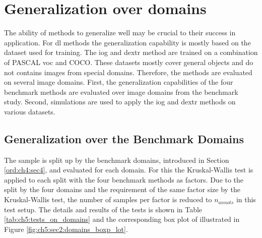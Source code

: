 
\section{Generalization over domains}\label{ord:ch5:sec2}

The ability of methods to generalize well may be crucial to their success in application.
For \gls{dl} methods the generalization capability is mostly based on the dataset used for training.
The \gls{iog} and \gls{dextr} method are trained on a combination of PASCAL \gls{voc} and COCO.
These datasets mostly cover general objects and do not contains images from special domains.
Therefore, the methods are evaluated on several image domains.
First, the generalization capabilities of the four benchmark methods are evaluated over image domains from the benchmark study.
Second, simulations are used to apply the \gls{iog} and \gls{dextr} methods on various datasets.

\subsection{Generalization over the Benchmark Domains}
The sample is split up by the benchmark domains, introduced in Section \ref{ord:ch4:sec4}, and evaluated for each domain.
For this the Kruskal-Wallis test is applied to each split with the four benchmark methods as factors.
Due to the split by the four domains and the requirement of the same factor size by the Kruskal-Wallis test, the number of samples per factor is reduced to $n_{annots}$ in this test setup.
The details and results of the tests is shown in Table \ref{tab:ch5:tests_on_domains} and the corresponding box plot of illustrated in Figure \ref{fig:ch5:sec2:domains_boxp_lot}.

